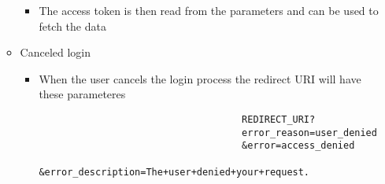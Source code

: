 \documentclass{article}
\begin{document}
\begin{itemize}
\begin{itemize}
\begin{itemize}
\begin{verbatim}
								\end{verbatim}
								\item The access token is then read from the parameters and can be used to fetch the data
							\end{itemize}
						\item Canceled login
							\begin{itemize}
								\item When the user cancels the login process the redirect URI will have these parameteres
								\begin{verbatim}
									REDIRECT_URI?
  									error_reason=user_denied
  									&error=access_denied
  									&error_description=The+user+denied+your+request.
								\end{verbatim}
							\end{itemize}
					\end{itemize}


\end{itemize}
\end{document}
